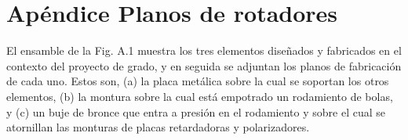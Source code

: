 
\chapter{Apéndice Planos de rotadores} %

\label{AppendixA} %


\graphicspath{{Figures/planos_piezas_rotador/}{../Figures/planos_piezas_rotador/}} 

El ensamble de la Fig. A.1 muestra los tres elementos diseñados y
fabricados en el contexto del proyecto de grado, y en seguida se adjuntan los planos de
fabricación de cada uno. Estos son, (a) la placa metálica sobre la cual se
soportan los otros elementos, (b) la montura sobre la cual está
empotrado un rodamiento de bolas, y (c) un buje de bronce que entra a
presión en el rodamiento y sobre el cual se atornillan las monturas de
placas retardadoras y polarizadores. 

